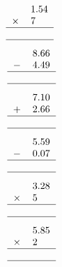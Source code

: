 \documentclass[leqno, 12pt]{article}
\begin{document}
\begin{multicols}{3}
\begin{equation}
{        \begin{tabular}{c S[table-format=1.2]}
         &1.54 \tabularnewline
        $\times$&7 \tabularnewline
        \hline
         & \tabularnewline
        \hline
    \end{tabular}}
\end{equation}
\vspace{-1pt}%
\begin{equation}
    \raisebox{-0.8cm}{
        \begin{tabular}{c S[table-format=1.2]}
         &8.66 \tabularnewline
        $-$&4.49 \tabularnewline
        \hline
         & \tabularnewline
        \hline
    \end{tabular}}
\end{equation}
\vspace{-1pt}%
\begin{equation}
    \raisebox{-0.8cm}{
        \begin{tabular}{c S[table-format=1.2]}
         &7.10 \tabularnewline
        $+$&2.66 \tabularnewline
        \hline
         & \tabularnewline
        \hline
    \end{tabular}}
\end{equation}
\vspace{-1pt}%
\begin{equation}
    \raisebox{-0.8cm}{
        \begin{tabular}{c S[table-format=1.2]}
         &5.59 \tabularnewline
        $-$&0.07 \tabularnewline
        \hline
         & \tabularnewline
        \hline
    \end{tabular}}
\end{equation}
\vspace{-1pt}%
\begin{equation}
    \raisebox{-0.8cm}{
        \begin{tabular}{c S[table-format=1.2]}
         &3.28 \tabularnewline
        $\times$&5 \tabularnewline
        \hline
         & \tabularnewline
        \hline
    \end{tabular}}
\end{equation}
\vspace{-1pt}%
\begin{equation}
    \raisebox{-0.8cm}{
        \begin{tabular}{c S[table-format=1.2]}
         &5.85 \tabularnewline
        $\times$&2 \tabularnewline
        \hline
         & \tabularnewline
        \hline
    \end{tabular}}

\end{equation}
\end{multicols}
\end{document}
